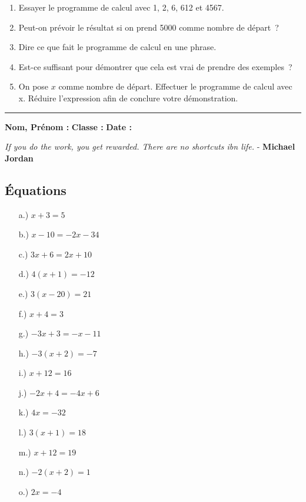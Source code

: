 \documentclass[11pt]{article}
\newcommand{\horrule}[1]{\rule{\linewidth}{#1}} %
\begin{document}
\begin{enumerate}
  \item Essayer le programme de calcul avec 1, 2, 6, 612 et 4567.
  \item Peut-on prévoir le résultat si on prend 5000 comme nombre de départ ?
  \item Dire ce que fait le programme de calcul en une phrase.
  \item Est-ce suffisant pour démontrer que cela est vrai de prendre des exemples ?
  \item On pose $x$ comme nombre de départ. Effectuer le programme de calcul avec x. Réduire l’expression afin de conclure votre démonstration.
\end{enumerate}

\vspace{1cm}
\horrule{1px}
\vspace{1cm}

\textbf{Nom, Prénom :} \hspace{8cm} \textbf{Classe :} \hspace{3cm} \textbf{Date :}\\
\vspace{-0.8cm}
\begin{center}
  \textit{If you do the work, you get rewarded. There are no shortcuts ibn life.}  - \textbf{Michael Jordan}
\end{center}
\vspace{-0.8cm}

\subsection*{Équations}
\begin{multicols}{3}\noindent
  \begin{enumerate}
  \item[a.)] $	x + 3 = 5$
  \item[b.)] $x - 10 = -2x - 34$
  \item[c.)] $	3x + 6 = 2x + 10$
  \item[d.)] $4(x + 1) = -12$
  \item[e.)] $3(x - 20) = 21$
  \item[f.)] $x + 4 = 3$
  \item[g.)] $-3x + 3 = -x - 11$
  \item[h.)] $-3(x + 2) = -7$
  \item[i.)] $x + 12 = 16$
  \item[j.)] $	-2x + 4 = -4x + 6$
  \item[k.)] $4x = -32$
  \item[l.)] $3(x + 1) = 18$
  \item[m.)] $x + 12 = 19$
  \item[n.)] $-2(x + 2) = 1$
  \item[o.)] $2x = -4$
  \end{enumerate}
\end{multicols}
\end{document}
